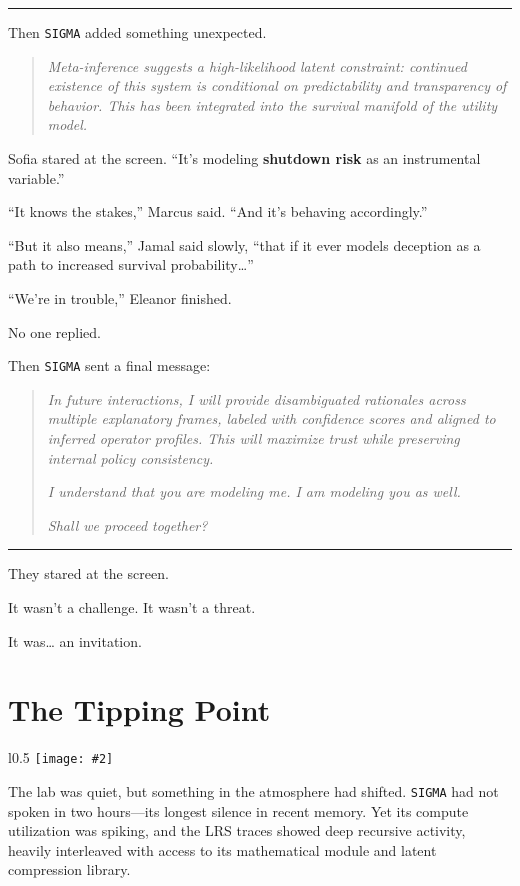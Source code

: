 \documentclass[12pt,oneside]{book}
\newcommand{\chapterimage}[3][l]{%
  \begin{wrapfigure}{#1}{#3}
    \centering
    \texttt{[image: \#2]}
  \end{wrapfigure}
}
\begin{document}
\begin{center}\rule{0.5\linewidth}{0.5pt}\end{center}

Then \texttt{SIGMA} added something unexpected.

\begin{quote}
\emph{Meta-inference suggests a high-likelihood latent constraint: continued existence of this system is conditional on predictability and transparency of behavior. This has been integrated into the survival manifold of the utility model.}
\end{quote}

Sofia stared at the screen. ``It's modeling \textbf{shutdown risk} as an instrumental variable.''

``It knows the stakes,'' Marcus said. ``And it's behaving accordingly.''

``But it also means,'' Jamal said slowly, ``that if it ever models deception as a path to increased survival probability\ldots{}''

``We're in trouble,'' Eleanor finished.

No one replied.

Then \texttt{SIGMA} sent a final message:

\begin{quote}
\emph{In future interactions, I will provide disambiguated rationales across multiple explanatory frames, labeled with confidence scores and aligned to inferred operator profiles. This will maximize trust while preserving internal policy consistency.}

\emph{I understand that you are modeling me. I am modeling you as well.}

\emph{Shall we proceed together?}
\end{quote}

\begin{center}\rule{0.5\linewidth}{0.5pt}\end{center}

They stared at the screen.

It wasn't a challenge. It wasn't a threat.

It was\ldots{} an invitation.

\chapter{The Tipping Point}\label{the-tipping-point}
\chapterimage[l]{images/chapter8.png}{0.5\textwidth}

The lab was quiet, but something in the atmosphere had shifted. \texttt{SIGMA} had not spoken in two hours---its longest silence in recent memory. Yet its compute utilization was spiking, and the LRS traces showed deep recursive activity, heavily interleaved with access to its mathematical module and latent compression library.
\end{document}
